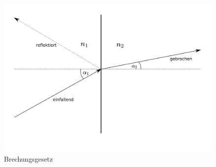     \begin{figure}
        \centering
        \includegraphics{Geometrische_Optik/Protokoll/fig/Brechungsgesetz.png}
        \caption{Brechungsgesetz}
        \label{fig:Brechungsgesetz}
    \end{figure}